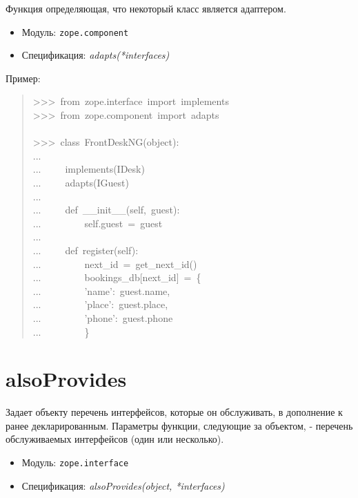 \documentclass[a4paper,openany,twoside,final]{book}
\providecommand*{\DUroletitlereference}[1]{\textsl{#1}}
\begin{document}
Функция определяющая, что некоторый класс является адаптером.

\begin{itemize}

\item Модуль: \texttt{zope.component}

\item Спецификация: \DUroletitlereference{adapts(*interfaces)}

\end{itemize}

Пример:

\begin{quote}{\ttfamily \raggedright \noindent
>{}>{}>~from~zope.interface~import~implements\\
>{}>{}>~from~zope.component~import~adapts\\
~\\
>{}>{}>~class~FrontDeskNG(object):\\
...\\
...~~~~~implements(IDesk)\\
...~~~~~adapts(IGuest)\\
...\\
...~~~~~def~\_\_init\_\_(self,~guest):\\
...~~~~~~~~~self.guest~=~guest\\
...\\
...~~~~~def~register(self):\\
...~~~~~~~~~next\_id~=~get\_next\_id()\\
...~~~~~~~~~bookings\_db{[}next\_id{]}~=~\{\\
...~~~~~~~~~'name':~guest.name,\\
...~~~~~~~~~'place':~guest.place,\\
...~~~~~~~~~'phone':~guest.phone\\
...~~~~~~~~~\}
}
\end{quote}


\section*{alsoProvides%
  \label{alsoprovides}%
}

Задает объекту перечень интерфейсов, которые он обслуживать, в дополнение
к ранее декларированным.  Параметры функции, следующие за объектом, -
перечень обслуживаемых интерфейсов (один или несколько).

\begin{itemize}

\item Модуль: \texttt{zope.interface}

\item Спецификация: \DUroletitlereference{alsoProvides(object, *interfaces)}

\end{itemize}
\end{document}
